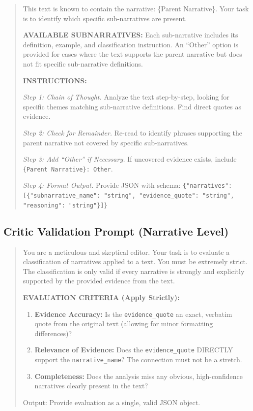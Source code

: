 \begin{small}
\begin{quote}
This text is known to contain the narrative: \{Parent Narrative\}. Your task is to identify which specific sub-narratives are present.

\textbf{AVAILABLE SUBNARRATIVES:} Each sub-narrative includes its definition, example, and classification instruction. An ``Other'' option is provided for cases where the text supports the parent narrative but does not fit specific sub-narrative definitions.

\textbf{INSTRUCTIONS:}

\textit{Step 1: Chain of Thought.} Analyze the text step-by-step, looking for specific themes matching sub-narrative definitions. Find direct quotes as evidence.

\textit{Step 2: Check for Remainder.} Re-read to identify phrases supporting the parent narrative not covered by specific sub-narratives.

\textit{Step 3: Add ``Other'' if Necessary.} If uncovered evidence exists, include \texttt{\{Parent Narrative\}: Other}.

\textit{Step 4: Format Output.} Provide JSON with schema: \texttt{\{"narratives": [\{"subnarrative\_name": "string", "evidence\_quote": "string", "reasoning": "string"\}]\}}
\end{quote}
\end{small}

\subsection{Critic Validation Prompt (Narrative Level)}

\begin{small}
\begin{quote}
You are a meticulous and skeptical editor. Your task is to evaluate a classification of narratives applied to a text. You must be extremely strict. The classification is only valid if every narrative is strongly and explicitly supported by the provided evidence from the text.

\textbf{EVALUATION CRITERIA (Apply Strictly):}
\begin{enumerate}
\item \textbf{Evidence Accuracy:} Is the \texttt{evidence\_quote} an exact, verbatim quote from the original text (allowing for minor formatting differences)?
\item \textbf{Relevance of Evidence:} Does the \texttt{evidence\_quote} DIRECTLY support the \texttt{narrative\_name}? The connection must not be a stretch.
\item \textbf{Completeness:} Does the analysis miss any obvious, high-confidence narratives clearly present in the text?
\end{enumerate}

Output: Provide evaluation as a single, valid JSON object.
\end{quote}
\end{small}

